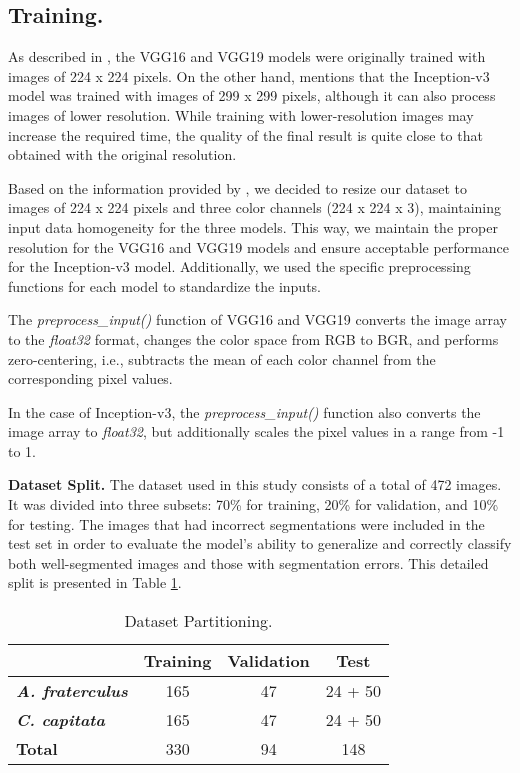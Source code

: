 \subsection{Training.}

As described in \cite{20Simonyan2015}, the VGG16 and VGG19 models were originally trained with images of 224 x 224 pixels. On the other hand, \cite{21Szegedy2016} mentions that the Inception-v3 model was trained with images of 299 x 299 pixels, although it can also process images of lower resolution. While training with lower-resolution images may increase the required time, the quality of the final result is quite close to that obtained with the original resolution.

Based on the information provided by \cite{20Simonyan2015, 21Szegedy2016}, we decided to resize our dataset to images of 224 x 224 pixels and three color channels (224 x 224 x 3), maintaining input data homogeneity for the three models. This way, we maintain the proper resolution for the VGG16 and VGG19 models and ensure acceptable performance for the Inception-v3 model. Additionally, we used the specific preprocessing functions for each model to standardize the inputs.

The \textit{preprocess\_input()} function of VGG16 \cite{25tensorflowvgg16} and VGG19 \cite{26tensorflowvgg17} converts the image array to the \textit{float32} format, changes the color space from RGB to BGR, and performs zero-centering, i.e., subtracts the mean of each color channel from the corresponding pixel values.

In the case of Inception-v3, the \textit{preprocess\_input()} function \cite{27tensorflowinceptionv3} also converts the image array to \textit{float32}, but additionally scales the pixel values in a range from -1 to 1.

\textbf{Dataset Split.} The dataset used in this study consists of a total of 472 images. It was divided into three subsets: 70\% for training, 20\% for validation, and 10\% for testing. The images that had incorrect segmentations were included in the test set in order to evaluate the model's ability to generalize and correctly classify both well-segmented images and those with segmentation errors. This detailed split is presented in Table \ref{tab:datosentrenamiento}.

\begin{table}[htbp]
	\centering
	\caption{Dataset Partitioning.}
	\label{tab:datosentrenamiento}
	\begin{tabular}{|l|c|c|c|}
		\hline
		& \textbf{Training} & \textbf{Validation} & \textbf{Test} \\
		\hline
		\textbf{\textit{A. fraterculus}} & 165 & 47 & 24 + 50 \\
		\hline
		\textbf{\textit{C. capitata}} & 165 & 47 & 24 + 50 \\
		\hline
		\textbf{Total} & 330 & 94 & 148 \\
		\hline
	\end{tabular}
\end{table}

